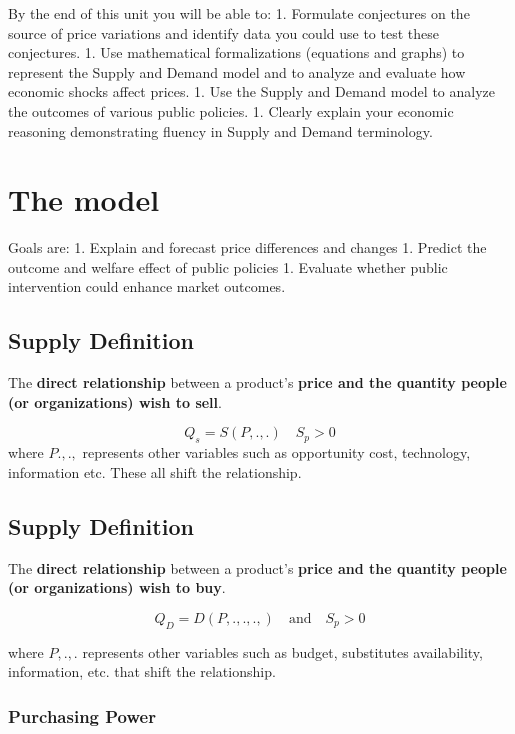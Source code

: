 \documentclass[
]{book}
\begin{document}
By the end of this unit you will be able to:
1. Formulate conjectures on the source of price variations and identify data you could use to test these conjectures.
1. Use mathematical formalizations (equations and graphs) to represent the Supply and Demand model and to analyze and evaluate how economic shocks affect prices.
1. Use the Supply and Demand model to analyze the outcomes of various public policies.
1. Clearly explain your economic reasoning demonstrating fluency in Supply and Demand terminology.

\hypertarget{the-model}{%
\section{The model}\label{the-model}}

Goals are:
1. Explain and forecast price differences and changes
1. Predict the outcome and welfare effect of public policies
1. Evaluate whether public intervention could enhance market outcomes.

\hypertarget{supply-definition}{%
\subsection{Supply Definition}\label{supply-definition}}

The \textbf{direct relationship} between a product's \textbf{price and the quantity people (or organizations) wish to sell}.

\[Q_s = S(P,.,.) \quad S_p > 0\]
where \(P.,.,\) represents other variables such as opportunity cost, technology, information etc. These all shift the relationship.

\hypertarget{supply-definition-1}{%
\subsection{Supply Definition}\label{supply-definition-1}}

The \textbf{direct relationship} between a product's \textbf{price and the quantity people (or organizations) wish to buy}.

\[
Q_D = D(P,.,.,.,) \quad \text{and} \quad S_p >0
\]

where \(P,.,.\) represents other variables such as budget, substitutes availability, information, etc. that shift the relationship.

\hypertarget{purchasing-power}{%
\subsubsection{Purchasing Power}\label{purchasing-power}}
\end{document}

